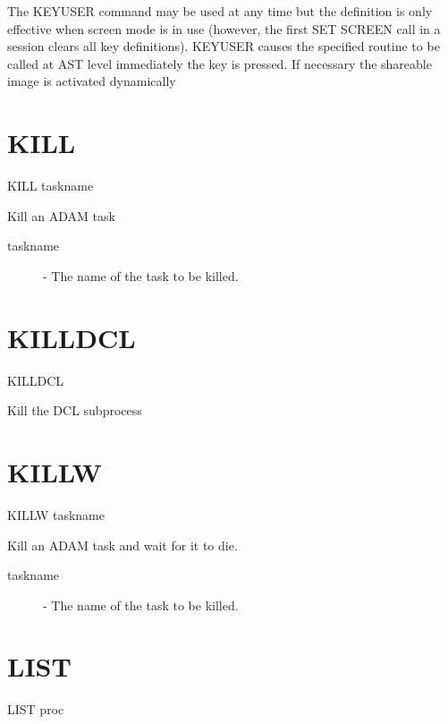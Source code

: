 \documentclass[twoside,11pt]{report}
\newcommand{\xlabel}[1]{}
\begin{document}
The KEYUSER command may be used at any time but the definition is only
effective when screen mode is in use (however, the first SET SCREEN call
in a session clears all key definitions). KEYUSER causes the specified routine
to be called at AST level immediately the key is pressed. If necessary the
shareable image is activated dynamically

\section{\xlabel{KILL}KILL\label{KILL}}

    KILL \hspace{.5cm} taskname

 Kill an ADAM task

\begin{description}

\item[taskname] -  The name of the task to be killed.

\end{description}

\section{\xlabel{KILLDCL}KILLDCL\label{KILLDCL}}

    KILLDCL

 Kill the DCL subprocess

\section{\xlabel{KILLW}KILLW\label{KILLW}}

    KILLW \hspace{.5cm} taskname

 Kill an ADAM task and wait for it to die.

\begin{description}

\item[taskname] -  The name of the task to be killed.

\end{description}

\section{\xlabel{LIST}LIST\label{LIST}}

    LIST \hspace{.5cm} proc
\end{document}
